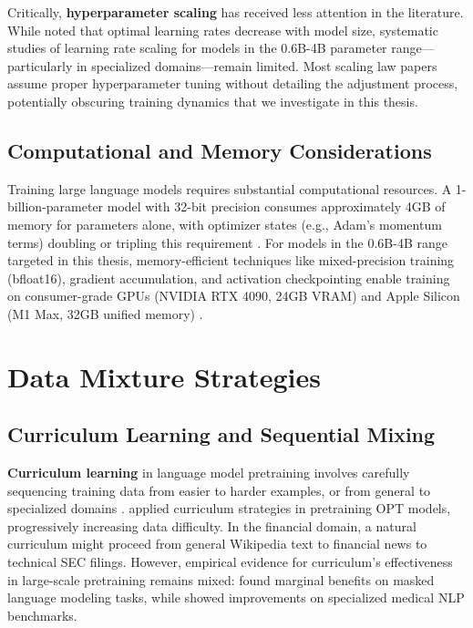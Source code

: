 Critically, \textbf{hyperparameter scaling} has received less attention in the literature. While \textcite{mccandlish2018empirical} noted that optimal learning rates decrease with model size, systematic studies of learning rate scaling for models in the 0.6B-4B parameter range---particularly in specialized domains---remain limited. Most scaling law papers assume proper hyperparameter tuning without detailing the adjustment process, potentially obscuring training dynamics that we investigate in this thesis.

\subsection{Computational and Memory Considerations}

Training large language models requires substantial computational resources. A 1-billion-parameter model with 32-bit precision consumes approximately 4GB of memory for parameters alone, with optimizer states (e.g., Adam's momentum terms) doubling or tripling this requirement \parencite{rajbhandari2020zero}. For models in the 0.6B-4B range targeted in this thesis, memory-efficient techniques like mixed-precision training (bfloat16), gradient accumulation, and activation checkpointing enable training on consumer-grade GPUs (NVIDIA RTX 4090, 24GB VRAM) and Apple Silicon (M1 Max, 32GB unified memory) \parencite{narayanan2021efficient}.

\section{Data Mixture Strategies}

\subsection{Curriculum Learning and Sequential Mixing}

\textbf{Curriculum learning} in language model pretraining involves carefully sequencing training data from easier to harder examples, or from general to specialized domains \parencite{bengio2009curriculum}. \textcite{wu2022opt} applied curriculum strategies in pretraining OPT models, progressively increasing data difficulty. In the financial domain, a natural curriculum might proceed from general Wikipedia text to financial news to technical SEC filings. However, empirical evidence for curriculum's effectiveness in large-scale pretraining remains mixed: \textcite{washington2020curriculum} found marginal benefits on masked language modeling tasks, while \textcite{xu2020curriculum} showed improvements on specialized medical NLP benchmarks.


